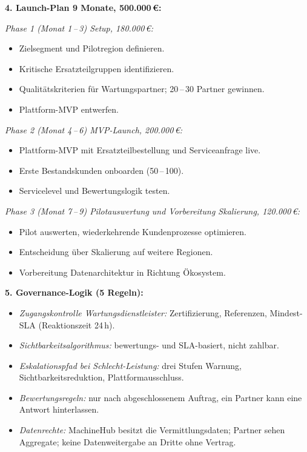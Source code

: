 \documentclass[11pt,a4paper,oneside]{article}
\begin{document}
\begin{loesungbox}
\textbf{4. Launch-Plan 9 Monate, 500.000\,\euro:}

\emph{Phase 1 (Monat 1\,--\,3) \textendash{} Setup, 180.000\,\euro:}
\begin{itemize}
  \item Zielsegment und Pilotregion definieren.
  \item Kritische Ersatzteilgruppen identifizieren.
  \item Qualitätskriterien für Wartungspartner; 20\,--\,30 Partner gewinnen.
  \item Plattform-MVP entwerfen.
\end{itemize}

\emph{Phase 2 (Monat 4\,--\,6) \textendash{} MVP-Launch, 200.000\,\euro:}
\begin{itemize}
  \item Plattform-MVP mit Ersatzteilbestellung und Serviceanfrage live.
  \item Erste Bestandskunden onboarden (50\,--\,100).
  \item Servicelevel und Bewertungslogik testen.
\end{itemize}

\emph{Phase 3 (Monat 7\,--\,9) \textendash{} Pilotauswertung und Vorbereitung Skalierung, 120.000\,\euro:}
\begin{itemize}
  \item Pilot auswerten, wiederkehrende Kundenprozesse optimieren.
  \item Entscheidung über Skalierung auf weitere Regionen.
  \item Vorbereitung Datenarchitektur in Richtung Ökosystem.
\end{itemize}

\textbf{5. Governance-Logik (5 Regeln):}
\begin{itemize}
  \item \emph{Zugangskontrolle Wartungsdienstleister:} Zertifizierung, Referenzen, Mindest-SLA (Reaktionszeit 24\,h).
  \item \emph{Sichtbarkeitsalgorithmus:} bewertungs- und SLA-basiert, nicht zahlbar.
  \item \emph{Eskalationspfad bei Schlecht-Leistung:} drei Stufen \textendash{} Warnung, Sichtbarkeitsreduktion, Plattformausschluss.
  \item \emph{Bewertungsregeln:} nur nach abgeschlossenem Auftrag, ein Partner kann eine Antwort hinterlassen.
  \item \emph{Datenrechte:} MachineHub besitzt die Vermittlungsdaten; Partner sehen Aggregate; keine Datenweitergabe an Dritte ohne Vertrag.
\end{itemize}


\end{loesungbox}
\end{document}
